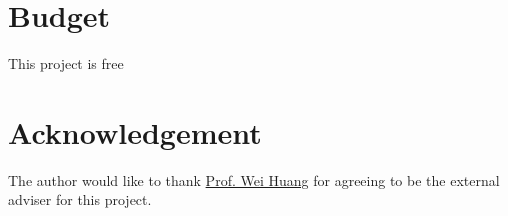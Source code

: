 \documentclass[a4paper, 11pt]{article}
\begin{document}
\section{Budget}
This project is free
\section*{Acknowledgement}
The author would like to thank \href{mailto:wei.huang@eng.ox.ac.uk}{Prof. Wei Huang} for agreeing to be the external adviser for this project.
\nocite{*}\printbibliography
\end{document}
